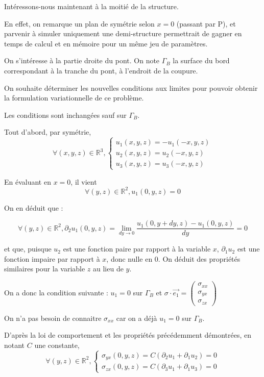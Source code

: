 

Intéressons-nous maintenant à la moitié de la structure. 

En effet, on remarque un plan de symétrie selon $x=0$ (passant par P), et parvenir à simuler uniquement une demi-structure permettrait de gagner en temps de calcul et en mémoire pour un même jeu de paramètres.

On s'intéresse à la partie droite du pont. On note $\Gamma_B$ la surface du bord correspondant à la tranche du pont, à l'endroit de la coupure.

On souhaite déterminer les nouvelles conditions aux limites pour pouvoir obtenir la formulation variationnelle de ce problème.

Les conditions sont inchangées sauf sur $\Gamma_B$.

Tout d'abord, par symétrie, 
$$\forall (x,y,z) \in \mathbb{R}^3,
\begin{cases}
 u_1(x,y,z) = - u_1(-x,y,z)\\
 u_2(x,y,z) = u_2(-x,y,z)\\
 u_3(x,y,z) = u_3(-x,y,z)
\end{cases}
$$

En évaluant en $x=0$, il vient
$$\forall (y,z) \in \mathbb{R}^2, u_1(0,y,z) = 0$$

On en déduit que :

$$\forall (y,z) \in \mathbb{R}^2, \partial_2 u_1 (0, y, z) = \lim_{dy\rightarrow 0} \frac{u_1(0,y+dy,z)-u_1(0,y,z)}{dy}=0$$

et que, puisque $u_2$ est une fonction paire par rapport à la variable $x$, $\partial_1 u_2$ est une fonction impaire par rapport à $x$, donc nulle en $0$. On déduit des propriétés similaires pour la variable $z$ au lieu de $y$.

On a donc la condition suivante : $u_1 = 0$ sur $\Gamma_B$ et $\sigma \cdot \vec{e_1}=
\begin{pmatrix}
    \sigma_{xx}\\
    \sigma_{yx}\\
    \sigma_{zx}
\end{pmatrix}$

On n'a pas besoin de connaitre $\sigma_{xx}$ car on a déjà $u_1 = 0$ sur $\Gamma_B$. 

D'après la loi de comportement et les propriétés précédemment démontrées, en notant $C$ une constante,
 $$
 \forall (y,z) \in \mathbb{R}^2,
 \begin{cases}
    \sigma_{yx}(0, y, z) = C (\partial_2 u_1 + \partial_1 u_2) = 0\\
    \sigma_{zx}(0, y, z) = C (\partial_3 u_1 + \partial_1 u_3) = 0
 \end{cases}
$$

